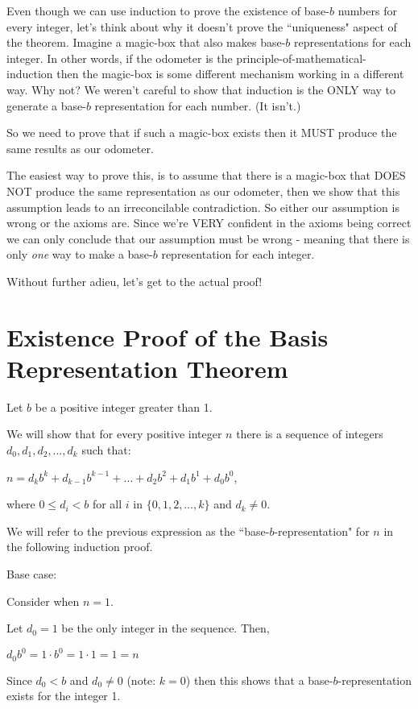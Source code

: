 \documentclass{article}
\newenvironment{jprIn}{\begin{adjustwidth}{2em}{}}{\end{adjustwidth}}
\begin{document}
\bigskip
Even though we can use induction to prove the existence of base-$b$
numbers for every integer, let's think about why it
doesn't prove the ``uniqueness" aspect of 
the theorem.
Imagine a magic-box
that also makes base-$b$ representations for each
integer.
In other words, if the odometer is the principle-of-mathematical-induction then the magic-box
is some different mechanism working in a different way.
Why not? We weren't careful to show that induction is the ONLY way
to generate a base-$b$ representation for each number. (It isn't.)

So we need to prove that if such a magic-box exists then it MUST
produce the same results as our odometer.

The easiest way to prove this, is to assume that there is a magic-box
that DOES NOT produce the same representation as our odometer, then we show that
this assumption leads to an irreconcilable contradiction.
So either our assumption is wrong or the axioms are.
Since we're VERY confident in the axioms being correct we can only 
conclude that our assumption must be wrong - meaning
that there is only \emph{one} way 
to make a base-$b$ representation for each integer.

Without further adieu, let's get to the actual proof!

\break
\section*{Existence Proof of the Basis Representation Theorem}
Let $b$ be a positive integer greater than 1.

We will show that for every positive integer $n$ there is a sequence
of integers $d_0, d_1, d_2,\dots{},d_k$ such that:

\hspace{3em}$n=d_kb^k+d_{k-1}b^{k-1}+\dots+d_2b^2+d_1b^1+d_0b^0$,

where $0\le{}d_i<b$ for all $i$ in $\{0,1,2,\dots{},k\}$ and $d_k\ne0$.

\bigskip
We will refer to the previous expression as the
``base-$b$-representation" for $n$ in the following induction proof.

\bigskip
Base case:
\begin{jprIn}
Consider when $n=1$.

Let $d_0=1$ be the only integer in the sequence.  Then,

\hspace{3em}$d_0b^0=1\cdot{}b^0=1\cdot{}1=1=n$

Since $d_0<b$ and $d_0\ne0$ (note: $k=0$) then this
shows that a 
base-$b$-representation exists for the integer 1.
\end{jprIn}
\end{document}
